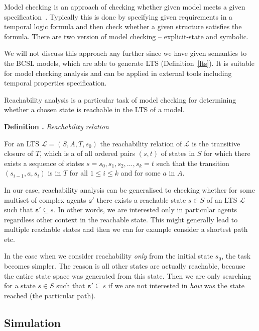 \documentclass[12pt]{fithesis2}
\newcounter{counter}[section]
\renewcommand{\thecounter}{\thesection.\arabic{counter}}
\newenvironment{definition}[1]{\bigskip\refstepcounter{counter}\noindent\textbf{Definition \thecounter } \textit{#1} \par\nopagebreak}{\bigskip}
\begin{document}
Model checking is an approach of checking whether given model meets a given specification~\cite{clarke1999model}. Typically this is done by specifying given requirements in a temporal logic formula and then check whether a given structure satisfies the formula. There are two version of model checking -- explicit-state and symbolic.

We will not discuss this approach any further since we have given semantics to the BCSL models, which are able to generate LTS (Definition~\ref{lts}). It is suitable for model checking analysis and can be applied in external tools including temporal properties specification.

Reachability analysis is a particular task of model checking for determining whether a chosen state is reachable in the LTS of a model.

\begin{definition}{Reachability relation}
\label{reachability_relation}
For an LTS $\mathcal{L} = (S, A, T, s_0)$ the reachability relation of $\mathcal{L}$ is the transitive closure of $T$, which is a of all ordered pairs $(s,t)$ of states in $S$ for which there exists a sequence of states $s = s_0, s_1, s_2, \ldots, s_k = t$ such that the transition $(s_{i-1}, a, s_i)$ is in $T$ for all $1 \leq i \leq k$ and for some $a$ in $A$.
\end{definition}

In our case, reachability analysis can be generalised to checking whether for some multiset of complex agents $\mathtt{s}'$ there exists a reachable state $s \in S$ of an LTS $\mathcal{L}$ such that $\mathtt{s}' \subseteq s$. In other words, we are interested only in particular agents regardless other context in the reachable state. This might generally lead to multiple reachable states and then we can for example consider a shortest path etc.

In the case when we consider reachability \emph{only} from the initial state $s_0$, the task becomes simpler. The reason is all other states are actually reachable, because the entire state space was generated from this state. Then we are only searching for a state $s \in S$ such that $\mathtt{s}' \subseteq s$ if we are not interested in \emph{how} was the state reached (the particular path).

\subsection{Simulation}
\label{simulation}
\end{document}
